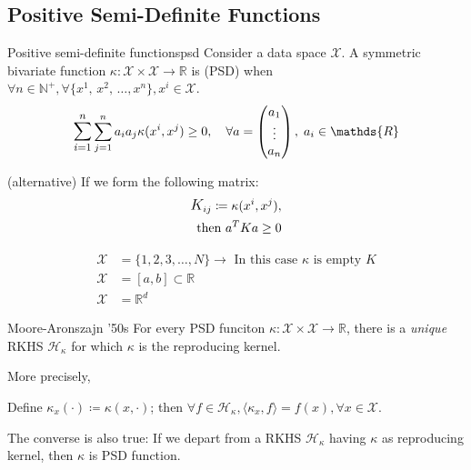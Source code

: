 \subsection{Positive Semi-Definite Functions}

\begin{definition}{Positive semi-definite functions}{psd}
	Consider a data space $\mathcal{X}$. A symmetric bivariate function
	$\kappa: \mathcal{X} \times \mathcal{X} \to \mathds{R}$ is
	 (PSD) when
	$\forall n \in \mathds{N}^+, \forall \{x^1,\, x^2,\,\dots, x^n\},
		x^i \in \mathcal{X}$.
	\begin{align*}
		\mathlarger{\sum_{i=1}^n} \sum_{j=1}^n  a_i a_j \kappa(x^i, x^j) \geq 0,\quad
		\forall a=\begin{pmatrix} a_1 \\ \vdots \\ a_n \end{pmatrix},\; a_i \in \mathds{R}
	\end{align*}

	\tcblower

	(alternative) If we form the following matrix:
	\begin{align*}
		\mathlarger{K}_{ij} \coloneqq \kappa(x^i, x^j), \\ \text{ then } a^TKa \geq 0
	\end{align*}
\end{definition}

\begin{example}{}{}
	\begin{align*}
		\mathcal{X} & = \{1, 2, 3, \dots, N \} \rightarrow{}
		\text{ In this case } \kappa \text{ is empty } K     \\
		\mathcal{X} & = [a,b] \subset \mathds{R}             \\
		\mathcal{X} & = \mathds{R}^d
	\end{align*}
\end{example}

\begin{theorem}[parbox=false]{Moore-Aronszajn '50s}{}
	For every PSD funciton $\kappa: \mathcal{X} \times \mathcal{X} \to \mathds{R}$, there
	is a \emph{unique} RKHS $\mathcal{H}_\kappa$ for which $\kappa$ is the reproducing kernel.

	\tcblower

	More precisely,

	Define $\kappa_x(\cdot) \coloneqq \kappa(x, \cdot)$; then
	$\forall f \in \mathcal{H}_\kappa,
		\langle \kappa_x, f \rangle = f(x), \forall x \in \mathcal{X}$.

	\begin{note}The converse is also true:
		If we depart from a RKHS $\mathcal{H}_{\kappa}$ having
		$\kappa$ as reproducing kernel, then $\kappa$ is PSD function.
	\end{note}
\end{theorem}

